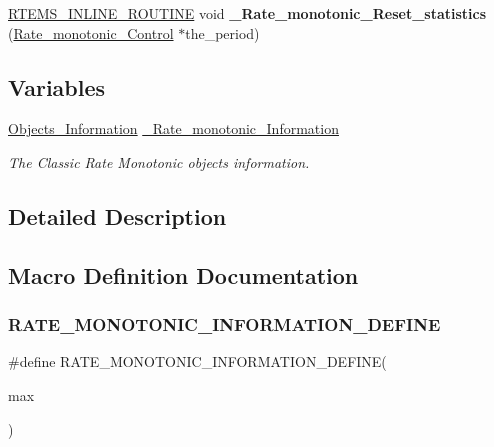\begin{DoxyCompactItemize}
\item 
\mbox{\label{group__ClassicRateMonImpl_gaca5bc85e1ebdb42e97eea716854143eb}} 
\mbox{\hyperlink{group__RTEMSScoreBaseDefs_gac216239df231d5dbd15e3520b0b9313f}{R\+T\+E\+M\+S\+\_\+\+I\+N\+L\+I\+N\+E\+\_\+\+R\+O\+U\+T\+I\+NE}} void {\bfseries \+\_\+\+Rate\+\_\+monotonic\+\_\+\+Reset\+\_\+statistics} (\mbox{\hyperlink{structRate__monotonic__Control}{Rate\+\_\+monotonic\+\_\+\+Control}} $\ast$the\+\_\+period)
\end{DoxyCompactItemize}
\subsection*{Variables}
\begin{DoxyCompactItemize}
\item 
\mbox{\label{group__ClassicRateMonImpl_gaed04cc20c3387a3a9123337f977120c6}} 
\mbox{\hyperlink{structObjects__Information}{Objects\+\_\+\+Information}} \mbox{\hyperlink{group__ClassicRateMonImpl_gaed04cc20c3387a3a9123337f977120c6}{\+\_\+\+Rate\+\_\+monotonic\+\_\+\+Information}}
\begin{DoxyCompactList}\small\item\em The Classic Rate Monotonic objects information. \end{DoxyCompactList}\end{DoxyCompactItemize}


\subsection{Detailed Description}


\subsection{Macro Definition Documentation}
\mbox{\label{group__ClassicRateMonImpl_ga3dd4851012025d1535bd915e62316333}} 
\subsubsection{\texorpdfstring{RATE\_MONOTONIC\_INFORMATION\_DEFINE}{RATE\_MONOTONIC\_INFORMATION\_DEFINE}}
{\footnotesize\ttfamily \#define R\+A\+T\+E\+\_\+\+M\+O\+N\+O\+T\+O\+N\+I\+C\+\_\+\+I\+N\+F\+O\+R\+M\+A\+T\+I\+O\+N\+\_\+\+D\+E\+F\+I\+NE(\begin{DoxyParamCaption}\item[{}]{max }\end{DoxyParamCaption})}

